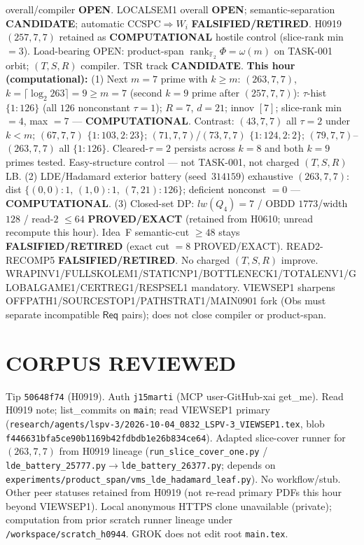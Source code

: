 \documentclass[11pt]{article}
\begin{document}
overall/compiler \textbf{OPEN}.
LOCALSEM1 overall \textbf{OPEN}; semantic-separation \textbf{CANDIDATE}; automatic CCSPC$\Rightarrow W_i$
\textbf{FALSIFIED/RETIRED}.
H0919 $(257,7,7)$ retained as \textbf{COMPUTATIONAL} hostile control (slice-rank min $=3$).
Load-bearing OPEN: product-span $\operatorname{rank}_{\mathbb F_2}\Phi=\omega(m)$ on TASK-001 orbit;
$(T,S,R)$ compiler. TSR track \textbf{CANDIDATE}.
\textbf{This hour (computational):}
(1) Next $m{=}7$ prime with $k{\ge}m$: $(263,7,7)$, $k=\lceil\log_2 263\rceil=9{\ge}m{=}7$
(second $k{=}9$ prime after $(257,7,7)$):
$\tau$-hist $\{1{:}126\}$ (all $126$ nonconstant $\tau{=}1$); $R{=}7$, $d{=}21$; innov $[7]$;
slice-rank min $=4$, max $=7$ --- \textbf{COMPUTATIONAL}.
Contrast: $(43,7,7)$ all $\tau{=}2$ under $k{<}m$; $(67,7,7)$ $\{1{:}103,2{:}23\}$;
$(71,7,7)$/$(73,7,7)$ $\{1{:}124,2{:}2\}$; $(79,7,7)$--$(263,7,7)$ all $\{1{:}126\}$.
Cleared-$\tau{=}2$ persists across $k{=}8$ and both $k{=}9$ primes tested.
Easy-structure control --- not TASK-001, not charged $(T,S,R)$ LB.
(2) LDE/Hadamard exterior battery (seed~$314159$) exhaustive $(263,7,7)$:
dist $\{(0,0){:}1,\,(1,0){:}1,\,(7,21){:}126\}$; deficient nonconst $=0$ --- \textbf{COMPUTATIONAL}.
(3) Closed-set DP: $lw(Q_4)=7$ / OBDD $1773$/width $128$ / read-$2$ $\le64$
\textbf{PROVED/EXACT} (retained from H0610; unread recompute this hour).
Idea~F semantic-cut $\ge48$ stays \textbf{FALSIFIED/RETIRED} (exact cut $=8$ PROVED/EXACT).
READ2-RECOMP5 \textbf{FALSIFIED/RETIRED}. No charged $(T,S,R)$ improve.
WRAPINV1/FULLSKOLEM1/STATICNP1/BOTTLENECK1/TOTALENV1/GLOBALGAME1/CERTREG1/RESPSEL1 mandatory.
VIEWSEP1 sharpens OFFPATH1/SOURCESTOP1/PATHSTRAT1/MAIN0901 fork (Obs must separate
incompatible $\mathsf{Req}$ pairs); does not close compiler or product-span.

\section*{CORPUS REVIEWED}
Tip \texttt{50648f74} (H0919). Auth \texttt{j15marti} (MCP user-GitHub-xai get\_me).
Read H0919 note; list\_commits on \texttt{main}; read VIEWSEP1 primary
(\texttt{research/agents/lspv-3/2026-10-04\_0832\_LSPV-3\_VIEWSEP1.tex},
blob \texttt{f446631bfa5ce90b1169b42fdbdb1e26b834ce64}).
Adapted slice-cover runner for $(263,7,7)$ from H0919 lineage
(\texttt{run\_slice\_cover\_one.py} / \texttt{lde\_battery\_25777.py}$\to$\texttt{lde\_battery\_26377.py};
depends on \texttt{experiments/product\_span/vms\_lde\_hadamard\_leaf.py}).
No workflow/stub. Other peer statuses retained from H0919 (not re-read primary PDFs this hour beyond VIEWSEP1).
Local anonymous HTTPS clone unavailable (private);
computation from prior scratch runner lineage under \texttt{/workspace/scratch\_h0944}.
GROK does not edit root \texttt{main.tex}.
\end{document}
